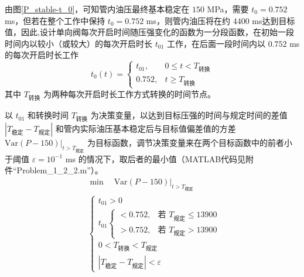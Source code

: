 \documentclass[12pt,a4paper]{article}
\begin{document}
由图\ref{P_stable-t_0}，可知管内油压最终基本稳定在 $150$ MPa，需要 $t_0=0.752$ ms，但若在整个工作中保持 $t_0=0.752$ ms，则管内油压将在约 $4400$ ms达到目标值，因此,设计单向阀每次开启时间随压强变化的函数为一分段函数，在初始一段时间内以较小（或较大）的每次开启时长 $t_{01}$ 工作，在后面一段时间内以 $0.752$ ms 的每次开启时长工作
\begin{equation}
t_0(t)=\left\{\begin{array}{ll}
t_{01},&0\leq t<T_{\text{转换}}\\
0.752,&t\geq T_{\text{转换}}
\end{array}\right.
\end{equation}
其中 $T_{\text{转换}}$ 为两种每次开启时长工作方式转换的时间节点。

以 $t_{01}$ 和转换时间 $T_{\text{转换}}$ 为决策变量，以达到目标压强的时间与规定时间的差值 $|T_{\text{稳定}}-T_{\text{规定}}|$ 和管内实际油压基本稳定后与目标值偏差值的方差 $\text{Var}(P-150)|_{t>T_{\text{规定}}}$ 为目标函数，调节决策变量来在两个目标函数中的前者小于阈值 $\varepsilon=10^{-1}$ ms 的情况下，取后者的最小值（MATLAB代码见附件“Problem\_1\_2\_2.m”）。
\begin{align}
&\min\quad\text{Var}(P-150)|_{t>T_{\text{规定}}}\\
&\left\{\begin{array}{l}
t_{01}>0\\
t_{01}\left\{\begin{array}{ll}<0.752,&\text{若 }T_{\text{规定}}\leq13900\\>0.752,&\text{若 }T_{\text{规定}}>13900\end{array}\right.\\
0<T_{\text{转换}}<T_{\text{规定}}\\
|T_{\text{稳定}}-T_{\text{规定}}|<\varepsilon
\end{array}\right.
\end{align}
\end{document}
